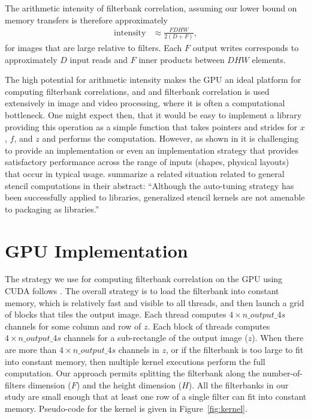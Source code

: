 \documentclass{sig-alternate}
\begin{document}
The arithmetic intensity of filterbank correlation, assuming our lower bound on memory transfers
is therefore approximately
\begin{align}
\mathrm{intensity} & \approx \frac {FDHW} {2(D+F)},
\end{align}
for images that are large relative to filters.
Each $F$ output writes corresponds to approximately $D$ input reads
and $F$ inner products between $DHW$ elements.

The high potential for arithmetic intensity makes the GPU an ideal platform for computing filterbank correlations,
and and filterbank correlation is used extensively in image and video processing,
where it is often a computational bottleneck.
One might expect then, that it would be easy to implement a library providing
this operation as a simple function that takes pointers and strides for $x$, $f$, and $z$ and performs the computation.
However, as shown in \citet{pinto+cox:2011gcg} 
it is challenging to provide an implementation
or even an implementation strategy that provides satisfactory performance
across the range of inputs (shapes, physical layouts) that occur in
typical usage.
\citet{kamil+etal:2009} summarize a related situation related to general stencil computations in their abstract:
``Although the auto-tuning strategy has been successfully applied to libraries,
generalized stencil kernels are not amenable to packaging as libraries.''



\section{GPU Implementation}
\label{sec:kernel}

The strategy we use for computing filterbank correlation on the GPU
using CUDA follows \citet{pinto+cox:2011gcg}.
The overall strategy is to load the filterbank into constant memory, which is
relatively fast and visible to all threads, and then launch a grid of blocks
that tiles the output image.
Each thread computes $4 \times n\_output\_4s$ channels for some column and row of $z$.
Each block of threads computes $4 \times n\_output\_4s$ channels for a sub-rectangle of the output image ($z$).
When there are more than $4 \times n\_output\_4s$ channels in $z$, or if the
filterbank is too large to fit into constant memory, then multiple
kernel executions perform the full computation.
Our approach permits splitting the filterbank along
the number-of-filters dimension ($F$) and the height dimension ($H$).
All the filterbanks in our study are small enough that
at least one row of a single filter can fit into constant memory.
Pseudo-code for the kernel is given in Figure~\ref{fig:kernel}.
\end{document}
